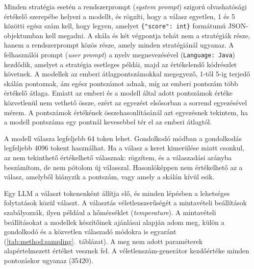 \documentclass[
]{elteikthesis}[2024/04/26]
\begin{document}
Minden stratégia esetén a rendszerprompt (\textit{system prompt}) szigorú
olvashatósági értékelő szerepébe helyezi a modellt, és rögzíti, hogy a válasz
egyetlen, 1 és 5 közötti egész szám kell, hogy legyen, amelyet
\texttt{\{"score": int\}} formátumú JSON-objektumban kell megadni. A skála és
két végpontja tehát nem a stratégiák része, hanem a rendszerprompt közös része,
amely minden stratégiánál ugyanaz. A felhasználói prompt (\textit{user prompt})
a nyelv megnevezésével (\texttt{Language: Java}) kezdődik, amelyet a stratégia
esetleges példái, majd az értékelendő kódrészlet követnek. 
A modellek az emberi átlagpontszámokkal megegyező, 1-től 5-ig terjedő skálán
pontoznak, ám egész pontszámot adnak, míg az emberi pontszám több értékelő
átlaga. Emiatt az emberi és a modell által adott pontszámok értéke közvetlenül
nem vethető össze, ezért az egyezést elsősorban a sorrend egyezésével mérem. A
pontszámok értékének összehasonlításánál azt egyezésnek tekintem, ha a modell
pontszáma egy pontnál kevesebbel tér el az emberi átlagtól. %

A modell válasza legfeljebb 64 token lehet. Gondolkodó módban a gondolkodás
legfeljebb 4096 tokent használhat. Ha a válasz a keret kimerülése miatt csonkul,
az nem tekinthető értékelhető válasznak: rögzítem, és a válaszadási arányba
beszámítom, de nem pótolom új válasszal. Hasonlóképpen nem értékelhető az a
válasz, amelyből hiányzik a pontszám, vagy amely a skálán kívül esik.

Egy LLM a választ tokenenként állítja elő, és minden lépésben a lehetséges
folytatások közül választ. %
A választás véletlenszerűségét a mintavételi beállítások szabályozzák, ilyen
például a hőmérséklet (\textit{temperature}). A mintavételi beállításokat a
modellek készítőinek ajánlásai alapján adom meg, külön a gondolkodó és a
közvetlen válaszadó módokra is egyaránt (\ref{tab:method:sampling}.~táblázat).
A meg nem adott paraméterek alapértelmezett értéket vesznek fel. A
véletlenszám-generátor kezdőértéke minden pontozáskor ugyanaz (35420).
\end{document}
